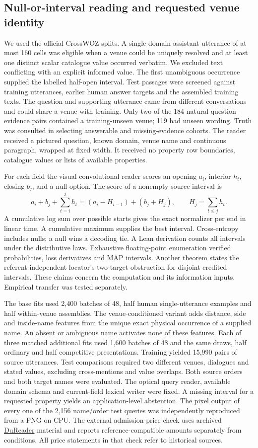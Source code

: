 \subsection*{Null-or-interval reading and requested venue identity}
We used the official CrossWOZ splits. A single-domain assistant utterance of at most 160 cells was eligible when a venue could be uniquely resolved and at least one distinct scalar catalogue value occurred verbatim. We excluded text conflicting with an explicit informed value. The first unambiguous occurrence supplied the labelled half-open interval. Test passages were screened against training utterances, earlier human answer targets and the assembled training texts. The question and supporting utterance came from different conversations and could share a venue with training. Only two of the 184 natural question--evidence pairs contained a training-unseen venue; 119 had unseen wording. Truth was consulted in selecting answerable and missing-evidence cohorts. The reader received a pictured question, known domain, venue name and continuous paragraph, wrapped at fixed width. It received no property row boundaries, catalogue values or lists of available properties.

For each field the visual convolutional reader scores an opening $a_i$, interior $h_t$, closing $b_j$, and a null option. The score of a nonempty source interval is
\[
 a_i+b_j+\sum_{t=i}^{j}h_t=(a_i-H_{i-1})+(b_j+H_j),\qquad H_j=\sum_{t\le j}h_t .
\]
A cumulative log sum over possible starts gives the exact normalizer per end in linear time. A cumulative maximum supplies the best interval. Cross-entropy includes nulls; a null wins a decoding tie. A Lean derivation counts all intervals under the distributive laws. Exhaustive floating-point enumeration verified probabilities, loss derivatives and MAP intervals. Another theorem states the referent-independent locator's two-target obstruction for disjoint credited intervals. These claims concern the computation and its information inputs. Empirical transfer was tested separately.

The base fits used 2,400 batches of 48, half human single-utterance examples and half within-venue assemblies. The venue-conditioned variant adds distance, side and inside-name features from the unique exact physical occurrence of a supplied name. An absent or ambiguous name activates none of these features. Each of three matched additional fits used 1,600 batches of 48 and the same draws, half ordinary and half competitive presentations. Training yielded 15,990 pairs of source utterances. Test comparisons required two different venues, dialogues and stated values, excluding cross-mentions and value overlaps. Both source orders and both target names were evaluated. The optical query reader, available domain schema and current-field lexical writer were fixed. A missing interval for a requested property yields an application-level abstention. The pixel output of every one of the 2,156 name/order test queries was independently reproduced from a PNG on CPU. The external admission-price check uses archived \href{https://aclanthology.org/W18-2605/}{DuReader} material and reports reference-compatible amounts separately from conditions. All price statements in that check refer to historical sources.

